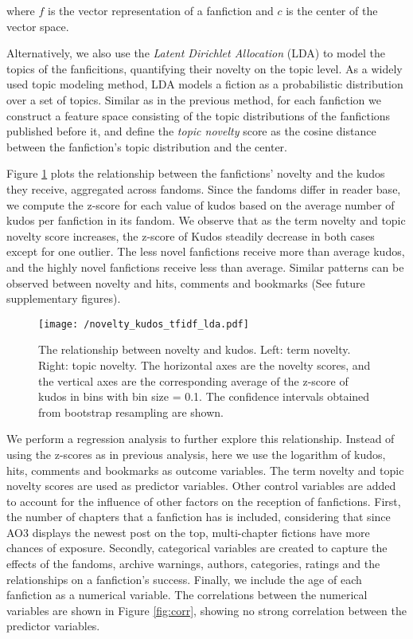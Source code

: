 \documentclass[a4paper]{article}
\begin{document}
where $f$ is the vector representation of a fanfiction and $c$ is the center of the vector space.

Alternatively, we also use the \emph{Latent Dirichlet Allocation} (LDA) \cite{blei2003latent} to model the topics of the fanficitions, quantifying their novelty on the topic level. As a widely used topic modeling method, LDA models a fiction as a probabilistic distribution over a set of topics. Similar as in the previous method, for each fanfiction we construct a feature space consisting of the topic distributions of the fanfictions published before it, and define the \emph{topic novelty} score as the cosine distance between the fanfiction's topic distribution and the center. 

Figure \ref{fig:tfidf_lda_kudos} plots the relationship between the fanfictions' novelty and the kudos they receive, aggregated across fandoms. Since the fandoms differ in reader base, we compute the z-score for each value of kudos based on the average number of kudos per fanfiction in its fandom. We observe that as the term novelty and topic novelty score increases, the z-score of Kudos steadily decrease in both cases except for one outlier. The less novel fanfictions receive more than average kudos, and the highly novel fanfictions receive less than average. Similar patterns can be observed between novelty and hits, comments and bookmarks (See future supplementary figures).

\begin{figure}
    \centering
          \texttt{[image: /novelty\_kudos\_tfidf\_lda.pdf]}
        \caption{The relationship between novelty and kudos. Left: term novelty. Right: topic novelty. The horizontal axes are the novelty scores, and the vertical axes are the corresponding average of the z-score of kudos in bins with bin size = 0.1. The confidence intervals obtained from bootstrap resampling are shown. }
        \label{fig:tfidf_lda_kudos}
\end{figure}


We perform a regression analysis to further explore this relationship. Instead of using the z-scores as in previous analysis, here we use the logarithm of kudos, hits, comments and bookmarks as outcome variables. The term novelty and topic novelty scores are used as predictor variables. Other control variables are added to account for the influence of other factors on the reception of fanfictions. First, the number of chapters that a fanfiction has is included, considering that since AO3 displays the newest post on the top, multi-chapter fictions have more chances of exposure. Secondly, categorical variables are created to capture the effects of the fandoms, archive warnings, authors, categories, ratings and the relationships on a fanfiction's success. Finally, we include the age of each fanfiction as a numerical variable. The correlations between the numerical variables are shown in Figure \ref{fig:corr}, showing no strong correlation between the predictor variables.
\end{document}
